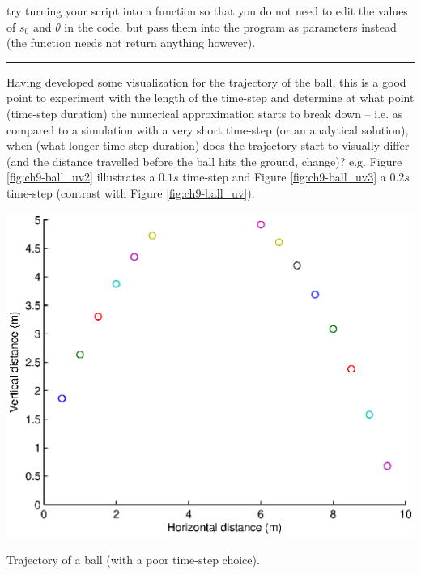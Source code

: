 \documentclass{tufte-book} %
\begin{document}
\newpage 

 try turning your script into a function so that you do not need to edit the values of \(s_{0}\) and \(\theta\) in the code, but pass them into the program as parameters instead (the function needs not return anything however).

\vspace{1mm}
\noindent\rule{4cm}{0.5pt}
\vspace{2mm}

\noindent Having developed some visualization for the trajectory of the ball, this is a good point to experiment with the length of the time-step and determine at what point (time-step duration) the numerical approximation starts to break down -- i.e. as compared to a simulation with a very short time-step (or an analytical solution), when (what longer time-step duration) does the trajectory start to visually differ (and the distance travelled before the ball hits the ground, change)? e.g. Figure \ref{fig:ch9-ball_uv2} illustrates a \(0.1s\) time-step and Figure \ref{fig:ch9-ball_uv3} a \(0.2s\) time-step (contrast with Figure \ref{fig:ch9-ball_uv}).

\begin{marginfigure}[-0.0in]
\includegraphics[width=\linewidth]{ch9-ball_uv2.eps}
\caption{Trajectory of a ball (with a poor time-step choice).}
\label{fig:ch9-ball_uv2}
\end{marginfigure}
\end{document}
